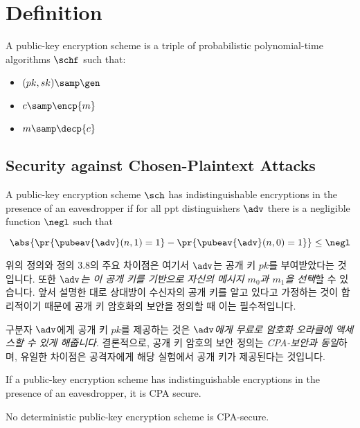 \section{Definition}

\begin{definition}
    A public-key encryption scheme is a triple of probabilistic polynomial-time algorithms $\schf$ such that:
    \begin{itemize}
        \item $(pk, sk) \samp \gen$
        \item $c \samp \encp{m}$
        \item $m \samp \decp{c}$
    \end{itemize}
\end{definition}

\subsection{Security against Chosen-Plaintext Attacks}


\begin{definition}
    A public-key encryption scheme $\sch$ has indistinguishable encryptions in the presence of an eavesdropper if for all ppt distinguishers $\adv$ there is a negligible function $\negl$ such that

    $$\abs{\pr{\pubeav{\adv}(n, 1) = 1} - \pr{\pubeav{\adv}(n, 0) = 1}} \le \negl$$
\end{definition}

위의 정의와 정의 3.8의 주요 차이점은 여기서 $\adv$는 공개 키 $pk$를 부여받았다는 것입니다. 또한 \emph{$\adv$는 이 공개 키를 기반으로 자신의 메시지 $m_0$과 $m_1$을 선택}할 수 있습니다. 앞서 설명한 대로 상대방이 수신자의 공개 키를 알고 있다고 가정하는 것이 합리적이기 때문에 공개 키 암호화의 보안을 정의할 때 이는 필수적입니다.

구분자 $\adv$에게 공개 키 $pk$를 제공하는 것은 \emph{$\adv$에게 무료로 암호화 오라클에 액세스할 수 있게 해줍니다}. 결론적으로, 공개 키 암호의 보안 정의는 \emph{CPA-보안과 동일}하며, 유일한 차이점은 공격자에게 해당 실험에서 공개 키가 제공된다는 것입니다.

\begin{proposition}
    If a public-key encryption scheme has indistinguishable encryptions in the presence of an eavesdropper, it is CPA secure.
\end{proposition}

\begin{theorem}
    No deterministic public-key encryption scheme is CPA-secure.
\end{theorem}